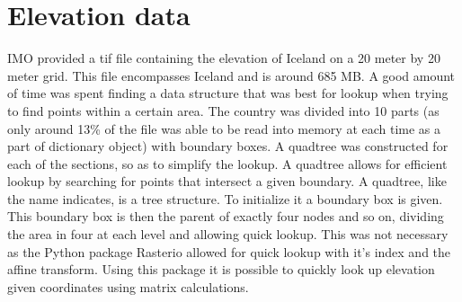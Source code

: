\section{Elevation data}
IMO provided a tif file containing the elevation of Iceland on a 20 meter by 20 meter grid. This file encompasses Iceland and is around 685 MB. A good amount of time was spent finding a data structure that was best for lookup when trying to find points within a certain area. The country was divided into 10 parts (as only around 13\% of the file was able to be read into memory at each time as a part of dictionary object) with boundary boxes. A quadtree was constructed for each of the sections, so as to simplify the lookup. A quadtree allows for efficient lookup by searching for points that intersect a given boundary. A quadtree, like the name indicates, is a tree structure. To initialize it a boundary box is given. This boundary box is then the parent of exactly four nodes and so on, dividing the area in four at each level and allowing quick lookup. This was not necessary as the Python package Rasterio allowed for quick lookup with it's index and the affine transform. Using this package it is possible to quickly look up elevation given coordinates using matrix calculations.